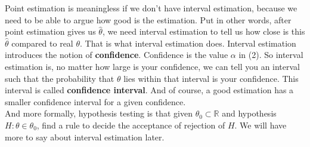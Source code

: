 Point estimation is meaningless if we don't have interval estimation, because we need to be able to argue how good is the estimation. Put in other words, after point estimation gives us $\hat{\theta}$, we need interval estimation to tell us how close is this $\hat{\theta}$ compared to real $\theta$. That is what interval estimation does. Interval estimation introduces the notion of \textbf{confidence}. Confidence is the value $\alpha$ in (2). So interval estimation is, no matter how large is your confidence, we can tell you an interval such that the probability that $\theta$ lies within that interval is your confidence. This interval is called \textbf{confidence interval}. And of course, a good estimation has a smaller confidence interval for a given confidence.\\

And more formally, hypothesis testing is that given $\theta_0 \subset \mathbb{R}$ and hypothesis $H: \theta \in \theta_0$, find a rule to decide the acceptance of rejection of $H$. We will have more to say about interval estimation later.